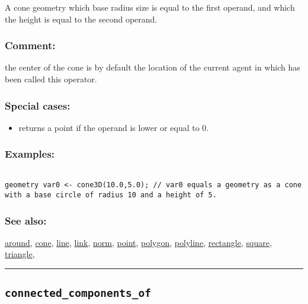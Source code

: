 \documentclass[]{book}
\providecommand{\tightlist}{%
  \setlength{\itemsep}{0pt}\setlength{\parskip}{0pt}}
\theoremstyle{definition}
\theoremstyle{definition}
\theoremstyle{definition}
\theoremstyle{remark}
\begin{document}
A cone geometry which base radius size is equal to the first operand,
and which the height is equal to the second operand.

\subsubsection{Comment:}\label{comment-23}

the center of the cone is by default the location of the current agent
in which has been called this operator.

\subsubsection{Special cases:}\label{special-cases-31}

\begin{itemize}
\tightlist
\item
  returns a point if the operand is lower or equal to 0.
\end{itemize}

\subsubsection{Examples:}\label{examples-73}

\begin{verbatim}
 
geometry var0 <- cone3D(10.0,5.0); // var0 equals a geometry as a cone with a base circle of radius 10 and a height of 5.
\end{verbatim}

\subsubsection{See also:}\label{see-also-59}

\href{OperatorsAA\#around}{around}, \href{OperatorsBC\#cone}{cone},
\href{OperatorsIM\#line}{line}, \href{OperatorsIM\#link}{link},
\href{OperatorsNR\#norm}{norm}, \href{OperatorsNR\#point}{point},
\href{OperatorsNR\#polygon}{polygon},
\href{OperatorsNR\#polyline}{polyline},
\href{OperatorsNR\#rectangle}{rectangle},
\href{OperatorsSZ\#square}{square},
\href{OperatorsSZ\#triangle}{triangle},

\begin{center}\rule{0.5\linewidth}{\linethickness}\end{center}

\subsection{\texorpdfstring{\texttt{connected\_components\_of}}{connected\_components\_of}}\label{connected_components_of}
\end{document}
